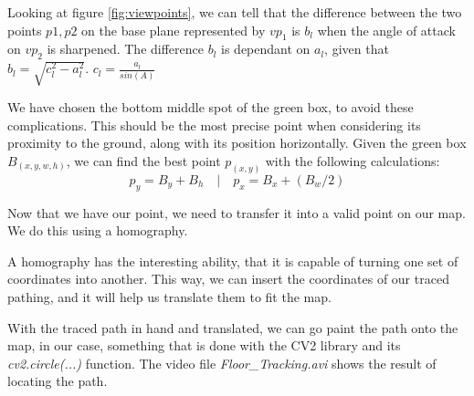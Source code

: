 Looking at figure \ref{fig:viewpoints}, we can tell that the difference between the two points \(p1,p2\) on the base plane represented by \(vp_1\) is \(b_l\) when the angle of attack on \(vp_2\) is sharpened. The difference \(b_l\) is dependant on \(a_l\), given that \(b_l = \sqrt{c_l^2-a_l^2}\). \(c_l = \frac{a_l}{sin(A)}\)\newline

We have chosen the bottom middle spot of the green box, to avoid these complications. This should be the most precise point when considering its proximity to the ground, along with its position horizontally. Given the green box \(B_(x,y,w,h)\), we can find the best point \(p_(x,y)\) with the following calculations:
\[p_y = B_y+B_h \quad | \quad p_x = B_x + (B_w / 2)\]

Now that we have our point, we need to transfer it into a valid point on our map. We do this using a homography.

A homography has the interesting ability, that it is capable of turning one set of coordinates into another. This way, we can insert the coordinates of our traced pathing, and it will help us translate them to fit the map.

With the traced path in hand and translated, we can go paint the path onto the map, in our case, something that is done with the CV2 library and its \textsl{cv2.circle(...)} function.
The video file \textsl{Floor\_Tracking.avi} shows the result of locating the path.

